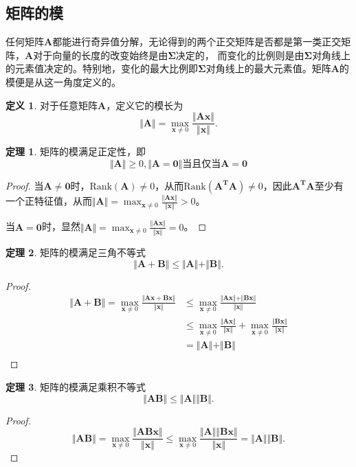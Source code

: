 \documentclass[12pt, a4paper, oneside]{ctexart}
\theoremstyle{remark}
\theoremstyle{definition}
\newtheorem{theorem}{定理}[section]
\theoremstyle{definition}
\newtheorem*{definition}{定义}
\theoremstyle{plain}
\begin{document}
\subsection{矩阵的模}
任何矩阵$\bm{A}$都能进行奇异值分解，无论得到的两个正交矩阵是否都是第一类正交矩阵，$\bm{A}$对于向量的长度的改变始终是由$\bm{\Sigma}$决定的，
而变化的比例则是由$\bm{\Sigma}$对角线上的元素值决定的。特别地，变化的最大比例即$\bm{\Sigma}$对角线上的最大元素值。矩阵$\bm{A}$的模便是从这一角度定义的。
\begin{definition}
    对于任意矩阵$\bm{A}$，定义它的模长为
    \[\Vert \bm{A}\Vert=\max_{\bm{x}\neq 0}\frac{\Vert \bm{Ax}\Vert}{\Vert\bm{x}\Vert}.\]
\end{definition}
\begin{theorem}
   矩阵的模满足正定性，即
   \[\Vert \bm{A}\Vert\geq 0,\Vert \bm{A}=\bm{0}\Vert\text{当且仅当}\bm{A}=\bm{0}\] 
\end{theorem}
\begin{proof}
    当$\bm{A}\neq\bm{0}$时，$\text{Rank}(\bm{A})\neq0$，从而$\text{Rank}(\bm{A^TA})\neq0$，因此$\bm{A^TA}$至少有一个正特征值，从而$\Vert \bm{A}\Vert=\max_{\bm{x}\neq 0}\frac{\Vert \bm{Ax}\Vert}{\Vert\bm{x}\Vert}>0$。

    当$\bm{A}=\bm{0}$时，显然$\Vert \bm{A}\Vert=\max_{\bm{x}\neq 0}\frac{\Vert \bm{Ax}\Vert}{\Vert\bm{x}\Vert}=0$。
\end{proof}
\begin{theorem}
    矩阵的模满足三角不等式
    \[\Vert\bm{A}+\bm{B}\Vert\leq \Vert\bm{A}\Vert+\Vert\bm{B}\Vert.\]
\end{theorem}
\begin{proof}
    \begin{align*}
   \Vert\bm{A}+\bm{B}\Vert=\max_{\bm{x}\neq 0}\frac{\Vert \bm{Ax+Bx}\Vert}{\Vert\bm{x}\Vert}&\leq \max_{\bm{x}\neq 0}\frac{\Vert \bm{Ax}\Vert+\Vert\bm{Bx}\Vert}{\Vert\bm{x}\Vert}\\
                                                                                            &\leq \max_{\bm{x}\neq 0}\frac{\Vert \bm{Ax}\Vert}{\Vert\bm{x}\Vert}+\max_{\bm{x}\neq 0}\frac{\Vert \bm{Bx}\Vert}{\Vert\bm{x}\Vert}\\
                                                                                            &=\Vert\bm{A}\Vert+\Vert\bm{B}\Vert\\
    \end{align*}
\end{proof}
\begin{theorem}
    矩阵的模满足乘积不等式
    \[\Vert\bm{A}\bm{B}\Vert\leq \Vert\bm{A}\Vert\Vert\bm{B}\Vert.\]
\end{theorem}
\begin{proof}
    \[\Vert\bm{A}\bm{B}\Vert=\max_{\bm{x}\neq 0}\frac{\Vert \bm{ABx}\Vert}{\Vert\bm{x}\Vert}\leq \max_{\bm{x}\neq 0}\frac{\Vert \bm{A}\Vert\Vert\bm{Bx}\Vert}{\Vert\bm{x}\Vert}=\Vert\bm{A}\Vert\Vert\bm{B}\Vert.\]
\end{proof}
\end{document}
